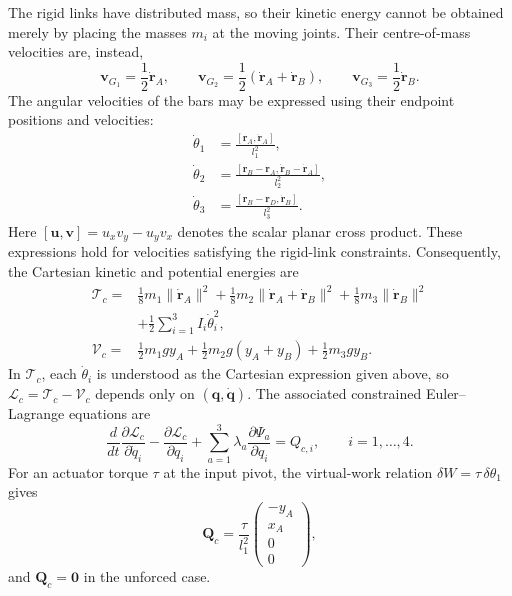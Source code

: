 The rigid links have distributed mass, so their kinetic energy cannot be obtained merely by placing the masses $m_i$ at the moving joints. Their centre-of-mass velocities are, instead,
\begin{equation}
    \mathbf v_{G_1}=\frac12\dot{\mathbf r}_A,\qquad
    \mathbf v_{G_2}=\frac12(\dot{\mathbf r}_A+\dot{\mathbf r}_B),\qquad
    \mathbf v_{G_3}=\frac12\dot{\mathbf r}_B.
\end{equation}
The angular velocities of the bars may be expressed using their endpoint positions and velocities:
\begin{align}
    \dot\theta_1&=\frac{[\mathbf r_A,\dot{\mathbf r}_A]}{l_1^2},\\
    \dot\theta_2&=\frac{[\mathbf r_B-\mathbf r_A,\dot{\mathbf r}_B-\dot{\mathbf r}_A]}{l_2^2},\\
    \dot\theta_3&=\frac{[\mathbf r_B-\mathbf r_D,\dot{\mathbf r}_B]}{l_3^2}.
\end{align}
Here $[\mathbf u,\mathbf v]=u_xv_y-u_yv_x$ denotes the scalar planar cross product. These expressions hold for velocities satisfying the rigid-link constraints. Consequently, the Cartesian kinetic and potential energies are
\begin{align}
    \mathcal T_c={}&\frac18m_1\lVert\dot{\mathbf r}_A\rVert^2
    +\frac18m_2\lVert\dot{\mathbf r}_A+\dot{\mathbf r}_B\rVert^2
    +\frac18m_3\lVert\dot{\mathbf r}_B\rVert^2\nonumber\\
    &+\frac12\sum_{i=1}^{3}I_i\dot\theta_i^2,\\
    \mathcal V_c={}&\frac12m_1gy_A+\frac12m_2g(y_A+y_B)+\frac12m_3gy_B.
\end{align}
In $\mathcal T_c$, each $\dot\theta_i$ is understood as the Cartesian expression given above, so $\mathcal L_c=\mathcal T_c-\mathcal V_c$ depends only on $(\mathbf q,\dot{\mathbf q})$. The associated constrained Euler--Lagrange equations are
\begin{equation}
    \frac{d}{dt}\frac{\partial\mathcal L_c}{\partial\dot q_i}
    -\frac{\partial\mathcal L_c}{\partial q_i}
    +\sum_{a=1}^{3}\lambda_a\frac{\partial\Psi_a}{\partial q_i}
    =Q_{c,i},\qquad i=1,\ldots,4.
    \label{eq:fourbar_cartesian_el}
\end{equation}
For an actuator torque $\tau$ at the input pivot, the virtual-work relation $\delta W=\tau\,\delta\theta_1$ gives
\begin{equation}
    \mathbf Q_c=\frac{\tau}{l_1^2}
    \begin{pmatrix}-y_A\\x_A\\0\\0\end{pmatrix},
\end{equation}
and $\mathbf Q_c=\mathbf0$ in the unforced case.

